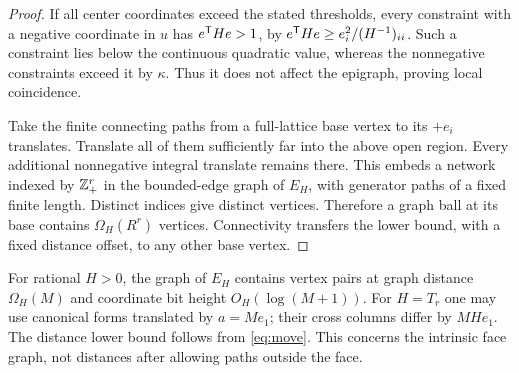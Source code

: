 \begin{proof}
If all center coordinates exceed the stated thresholds, every constraint with a negative coordinate in $u$ has $e^{\mathsf T} He>1$, by
$e^{\mathsf T} He\ge e_i^2/(H^{-1})_{ii}$. Such a constraint lies below the continuous quadratic value, whereas the nonnegative constraints exceed it by $\kappa$. Thus it does not affect the epigraph, proving local coincidence.

Take the finite connecting paths from a full-lattice base vertex to its $+e_i$ translates. Translate all of them sufficiently far into the above open region. Every additional nonnegative integral translate remains there. This embeds a network indexed by $\mathbb Z_+^r$ in the bounded-edge graph of $E_H$, with generator paths of a fixed finite length. Distinct indices give distinct vertices. Therefore a graph ball at its base contains $\Omega_H(R^r)$ vertices. Connectivity transfers the lower bound, with a fixed distance offset, to any other base vertex.
\end{proof}

\begin{corollary}
For rational $H>0$, the graph of $E_H$ contains vertex pairs at graph distance $\Omega_H(M)$ and coordinate bit height $O_H(\log(M+1))$. For $H=T_r$ one may use canonical forms translated by $a=Me_1$; their cross columns differ by $MH e_1$. The distance lower bound follows from \eqref{eq:move}. This concerns the intrinsic face graph, not distances after allowing paths outside the face.
\end{corollary}
